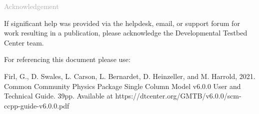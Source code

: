 \begin{titlepage}
\vspace*{0.5cm}
\noindent

\begin{flushleft}
\textcolor{darkgray}{\LARGE Acknowledgement}
\vspace*{1cm}\par

If significant help was provided via the helpdesk, email, or support forum for work resulting in a publication, please acknowledge the Developmental Testbed Center team.\\
\vspace*{1cm}\par
For referencing this document please use:\\
\vspace*{1cm}\par
Firl, G., D. Swales, L. Carson, L. Bernardet, D. Heinzeller, and M. Harrold, 2021. Common Community Physics Package Single Column Model v6.0.0 User and Technical Guide. 39pp. Available at https://dtcenter.org/GMTB/v6.0.0/scm-ccpp-guide-v6.0.0.pdf

\end{flushleft}
\end{titlepage}
\pagebreak{}
